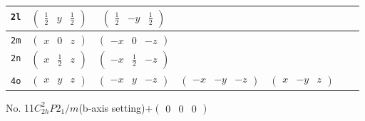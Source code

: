 \documentclass[fleqn,9pt,landscape]{jsarticle}
\begin{document}
\begin{center}
\begin{longtable}{ccccccc}
{\tt 2l} & $ \begin{pmatrix} \frac{1}{2} & y & \frac{1}{2} \end{pmatrix} $ & $ \begin{pmatrix} \frac{1}{2} & - y & \frac{1}{2} \end{pmatrix} $ & $  $ & $  $ \\ \hline
{\tt 2m} & $ \begin{pmatrix} x & 0 & z \end{pmatrix} $ & $ \begin{pmatrix} - x & 0 & - z \end{pmatrix} $ & $  $ & $  $ \\ \hline
{\tt 2n} & $ \begin{pmatrix} x & \frac{1}{2} & z \end{pmatrix} $ & $ \begin{pmatrix} - x & \frac{1}{2} & - z \end{pmatrix} $ & $  $ & $  $ \\ \hline
{\tt 4o} & $ \begin{pmatrix} x & y & z \end{pmatrix} $ & $ \begin{pmatrix} - x & y & - z \end{pmatrix} $ & $ \begin{pmatrix} - x & - y & - z \end{pmatrix} $ & $ \begin{pmatrix} x & - y & z \end{pmatrix} $ \\
\end{longtable}
\end{center}
\newpage
No. 11\quad$C_{2h}^{2}$\quad$P2_1/m$\quad(b-axis setting)\quad[ monoclinic ]\quad$+\begin{pmatrix} 0 & 0 & 0 \end{pmatrix}$
\end{document}
